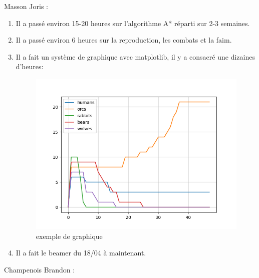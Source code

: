 \documentclass[a4paper, 11pt]{article}
\begin{document}
\newpage
Masson Joris : \\
\begin{enumerate}
\item Il a passé environ 15-20 heures sur l’algorithme  A* réparti sur 2-3 semaines.\\
\item Il a passé environ 6 heures sur la reproduction, les combats et la faim.\\
\item Il a fait un système de graphique avec matplotlib, il y a consacré une dizaines d'heures:\\
\begin{figure}[ht!]
 \centering
 \includegraphics[width=1\linewidth]{images/graph.png}
 \caption{exemple de graphique}
 \label{fig::example::one}
\end{figure}
\item Il a fait le beamer du 18/04 à maintenant.\\
\end{enumerate}
\newpage
Champenois Brandon : \\
\end{document}
